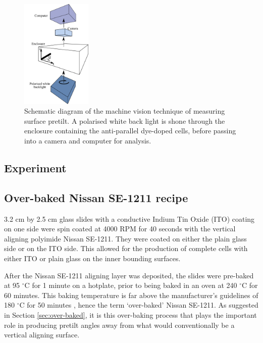 \begin{figure}
\begin{center}
\includegraphics[width=0.3\textwidth]{Figures/Pretilt/camera_kit}
\end{center}
\caption[Schematic diagram of machine vision setup]{\label{fig:camerakit}Schematic diagram of the machine vision technique of measuring surface pretilt. A polarised white back light is shone through the enclosure containing the anti-parallel dye-doped cells, before passing into a camera and computer for analysis.}
\end{figure}
\subsection{Experiment}

\subsection{Over-baked Nissan SE-1211 recipe}
\label{sec:1211recipe}
3.2 cm by 2.5 cm glass slides with a conductive Indium Tin Oxide (ITO) coating on one side were spin coated at 4000 RPM for 40 seconds with the vertical aligning polyimide Nissan SE-1211. They were coated on either the plain glass side or on the ITO side. This allowed for the production of complete cells with either ITO or plain glass on the inner bounding surfaces.

After the Nissan SE-1211 aligning layer was deposited, the slides were pre-baked at 95 $^\circ$C for 1 minute on a hotplate, prior to being baked in an oven at 240 $^\circ$C for 60 minutes. This baking temperature is far above the manufacturer's guidelines of 180 $^\circ$C for 50 minutes \cite{Wang2007}, hence the term `over-baked' Nissan SE-1211. As suggested in Section \ref{sec:over-baked}, it is this over-baking process that plays the important role in producing pretilt angles away from what would conventionally be a vertical aligning surface. 

